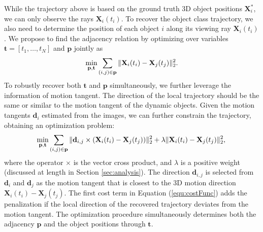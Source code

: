 While the trajectory above is based on the ground truth 3D object positions $\mathbf{X}_i^*$, we can only observe the rays $\mathbf{X}_i(t_i)$. To recover the object class trajectory, we also need to determine the position of each object $i$ along its viewing ray $\mathbf{X}_i(t_i)$.
We propose to find the adjacency relation by optimizing over variables $\mathbf{t}=[ t_1, \dots, t_N ]$ and $\mathbf{p}$ jointly as
\begin{equation}
\label{eq:pathsimpleray}
\underset{\mathbf{p},\mathbf{t}} { \text{min} }\sum_{(i,j)\in\mathbf{p}}{\|\mathbf{X}_i(t_i)-\mathbf{X}_j(t_j)\|_2^2}. \\
\end{equation}
To robustly recover both $\mathbf{t}$ and $\mathbf{p}$ simultaneously, we further leverage the information of motion tangent. The direction of the local trajectory should be the same or similar to the motion tangent of the dynamic objects. Given the motion tangents $\mathbf d_i$ estimated from the images, we can further constrain the trajectory, obtaining an optimization problem:
\begin{equation}
\label{equ:costFunc}
\underset{\mathbf{p},\mathbf{t}} { \text{min} }
\sum_{(i,j)\in\mathbf{p}}{\|\mathbf{d}_{i,j}\times(\mathbf{X}_i(t_i)-\mathbf{X}_j(t_j))\|_2^2 + \lambda\|\mathbf{X}_i(t_i)-\mathbf{X}_j(t_j)\|_2^2}, \\
\end{equation}
where the operator $\times$ is the vector cross product, and $\lambda$ is a positive weight (discussed at length in Section \ref{sec:analysis}). The direction $\mathbf{d}_{i,j}$ is selected from $\mathbf{d}_i$ and $\mathbf{d}_j$ as the motion tangent that is closest to the 3D motion direction $\mathbf{X}_i(t_i)-\mathbf{X}_j(t_j)$.
The first cost term in Equation (\ref{equ:costFunc}) adds the penalization if the local direction of the recovered trajectory deviates from the motion tangent.
The optimization procedure simultaneously determines both the adjacency $\mathbf{p}$ and the object positions through $\mathbf{t}$.

